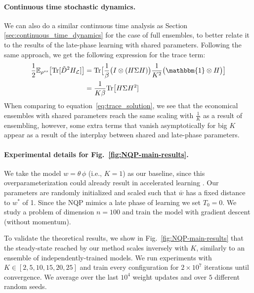 \documentclass{article} \usepackage{iclr2021_conference,times}
\def\eqref#1{equation~\ref{#1}}
\begin{document}
\paragraph{Continuous time stochastic dynamics.} We can also do a similar continuous time analysis as Section \ref{sec:continuous_time_dynamics} for the case of full ensembles, to better relate it to the results of the late-phase learning with shared parameters. Following the same approach, we get the following expression for the trace term: 
\begin{align}
    \frac{1}{2} \mathbb{E}_{\rho^{ss}} \big[\text{Tr}[\tilde{D}^2H_{\mathcal{L}}]\big] &= \text{Tr}\big[\frac{1}{\beta}\big(I\otimes (H\Sigma H)\big)\frac{1}{K^2}\big(\mathbbm{1}\otimes H\big)\big]\\
    &= \frac{1}{K\beta} \text{Tr}\big[H\Sigma H^2]
\end{align}
When comparing to \eqref{eq:trace_solution}, we see that the economical ensembles with shared parameters reach the same scaling with $\frac{1}{K}$ as a result of ensembling, however, some extra terms that vanish asymptotically for big $K$ appear as a result of the interplay between shared and late-phase parameters. 

\paragraph{Experimental details for Fig.~\ref{fig:NQP-main-results}.} We take the model $w=\theta \, \phi$ (i.e., $K=1$) as our baseline, since this overparameterization could already result in accelerated learning \citep{arora_optimization_2018}. Our parameters are randomly initialized and scaled such that $\bar{w}$ has a fixed distance to $w^*$ of 1. Since the NQP mimics a late phase of learning we set $T_0=0$. We study a problem of dimension $n=100$ and train the model with gradient descent (without momentum).

To validate the theoretical results, we show in Fig.~\ref{fig:NQP-main-results} that
the steady-state reached by our method scales inversely with $K$, similarly to an ensemble of independently-trained models. We run experiments with $K \in [2,5,10,15,20,25]$ and train every configuration for $2 \times 10^7$ iterations until convergence. We average over the last $10^4$ weight updates and over $5$ different random seeds.
\end{document}
